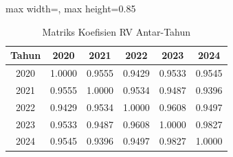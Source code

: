 \begin{table}[H]
\centering
\caption{Matriks Koefisien RV Antar-Tahun} \label{tab:apprv}
\begin{adjustbox}{max width=\textwidth, max height=0.85\textheight}
\begin{tabular}{|c|c|c|c|c|c|}
\hline
\textbf{Tahun} & \textbf{2020} & \textbf{2021} & \textbf{2022} & \textbf{2023} & \textbf{2024} \\
\hline
2020 & 1.0000 & 0.9555 & 0.9429 & 0.9533 & 0.9545 \\
2021 & 0.9555 & 1.0000 & 0.9534 & 0.9487 & 0.9396 \\
2022 & 0.9429 & 0.9534 & 1.0000 & 0.9608 & 0.9497 \\
2023 & 0.9533 & 0.9487 & 0.9608 & 1.0000 & 0.9827 \\
2024 & 0.9545 & 0.9396 & 0.9497 & 0.9827 & 1.0000 \\
\hline
\end{tabular}
\end{adjustbox}
\end{table}